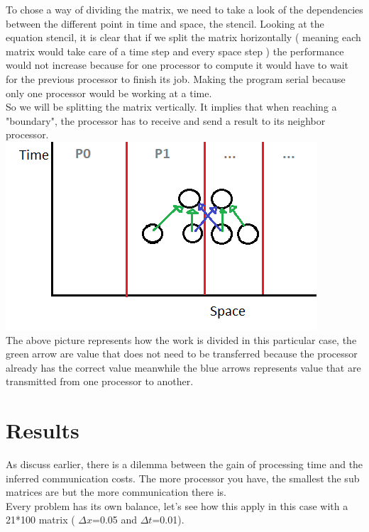 \documentclass[12pt, a4paper]{report}
\begin{document}
To chose a way of dividing the matrix, we need to take a look of the dependencies between the different point in time and space, the stencil.
Looking at the equation stencil, it is clear that if we split the matrix horizontally ( meaning each matrix would take care of a time step and every space step ) the performance would not increase because for one processor to compute it would have to wait for the previous processor to finish its job. Making the program serial because only one processor would be working at a time.\\
So we will be splitting the matrix vertically. It implies that when reaching a "boundary", the processor has to receive and send a result to its neighbor processor.\\
\includegraphics[scale=0.5]{report/stencilVertical.png}\\
The above picture represents how the work is divided in this particular case, the green arrow are value that does not need to be transferred because the processor already has the correct value meanwhile the blue arrows represents value that are transmitted from one processor to another.
\section{Results}
	As discuss earlier, there is a dilemma between the gain of processing time and the inferred communication costs. The more processor you have, the smallest the sub matrices are but the more communication there is.\\
	Every problem has its own balance, let's see how this apply in this case with a 21*100 matrix ( $\Delta x$=0.05 and $\Delta t$=0.01).
\end{document}
